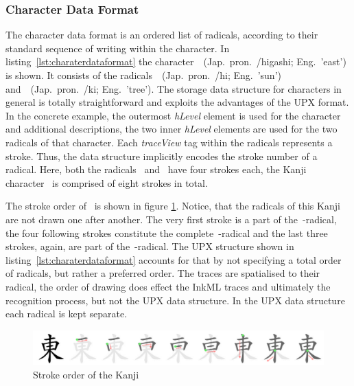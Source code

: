 \subsubsection{Character Data Format}
\label{sec:hwre:characterdataformat}

The character data format is an ordered list of radicals, according to their
standard sequence of writing within the character. In 
listing~\ref{lst:charaterdataformat} the 
character~~(Jap.\ pron.\ /higashi; Eng.\ 'east') 
is shown.
It consists of the 
radicals~~(Jap.\ pron.\ /hi; Eng.\ 'sun')
and~~(Jap.\ pron.\ /ki; Eng.\ 'tree').
The storage data structure 
for characters in general is totally straightforward and exploits the 
advantages of the UPX format.
In the concrete example, the outermost \emph{hLevel} element is used for the 
character and additional descriptions, the two inner \emph{hLevel} elements are 
used for the two radicals of that character. Each \emph{traceView} tag within 
the radicals represents a stroke. Thus, the data structure implicitly encodes
the stroke number of a radical. Here, both the radicals~ and~
have four strokes each, the Kanji character~ is comprised of 
eight strokes in total.

The stroke order of~ is shown in figure \ref{fig:strokeorderofEAST}.
Notice, that the radicals of this Kanji are not drawn one after another.
The very first stroke is a part of the~-radical, the four following
strokes constitute the complete~-radical and the last three strokes,
again, are part of the~-radical.
The UPX structure shown in listing~\ref{lst:charaterdataformat} accounts for
that by not specifying a total order of radicals, but rather a preferred order.
The traces are spatialised to their radical, the order of drawing does effect
the InkML traces and ultimately the recognition process, 
but not the UPX data structure. In the UPX data structure each radical is kept
separate.

\begin{figure}[htbp]
  \begin{center}
    \includegraphics[scale=1.75]{images/radicalStructure/EAST-strokeorder.png}
    \caption{Stroke order of the Kanji }
    \label{fig:strokeorderofEAST}
  \end{center}
\end{figure}

